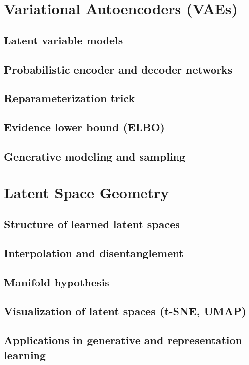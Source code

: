 \section{Variational Autoencoders (VAEs)}
\subsection{Latent variable models}
\subsection{Probabilistic encoder and decoder networks}
\subsection{Reparameterization trick}
\subsection{Evidence lower bound (ELBO)}
\subsection{Generative modeling and sampling}

\section{Latent Space Geometry}
\subsection{Structure of learned latent spaces}
\subsection{Interpolation and disentanglement}
\subsection{Manifold hypothesis}
\subsection{Visualization of latent spaces (t-SNE, UMAP)}
\subsection{Applications in generative and representation learning}

